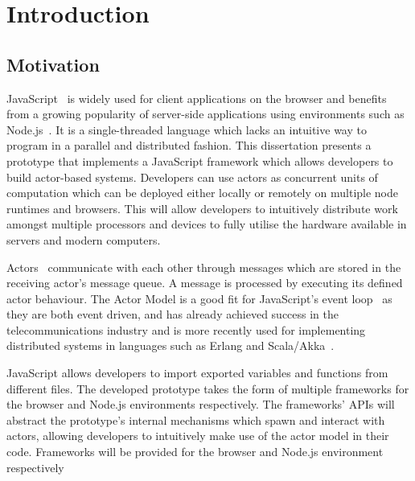 \documentclass[12pt, a4paper]{report}
\theoremstyle{definition}
\theoremstyle{definition}%
\theoremstyle{definition}%
\theoremstyle{definition}%
\theoremstyle{definition}%
\theoremstyle{definition}%
\begin{document}
\tableofcontents

\listoffigures

\mainmatter

\chapter{Introduction}
\section{Motivation}
JavaScript~\cite{ecmascript} is widely used for client applications on the browser and benefits from a growing popularity of server-side applications using environments such as Node.js~\cite{nodejs}. It is a single-threaded language which lacks an intuitive way to program in a parallel and distributed fashion. This dissertation presents a prototype that implements a JavaScript framework which allows developers to build actor-based systems. Developers can use actors as concurrent units of computation which can be deployed either locally or remotely on multiple node runtimes and browsers. This will allow developers to intuitively distribute work amongst multiple processors and devices to fully utilise the hardware available in servers and modern computers.

Actors~\cite{hewitt1973session}\cite{43years} communicate with each other through messages which are stored in the receiving actor's message queue. A message is processed by executing its defined actor behaviour. The Actor Model is a good fit for JavaScript's event loop~\cite{eventloopbrowser}\cite{eventloopnode} as they are both event driven, and has already achieved success in the telecommunications industry and is more recently used for implementing distributed systems in languages such as Erlang and Scala/Akka~\cite{haller2012integration}.

JavaScript allows developers to import exported variables and functions from different files. The developed prototype takes the form of multiple frameworks for the browser and Node.js environments respectively. The frameworks' APIs will abstract the prototype's internal mechanisms which spawn and interact with actors, allowing developers to intuitively make use of the actor model in their code. Frameworks will be provided for the browser and Node.js environment respectively
\end{document}
